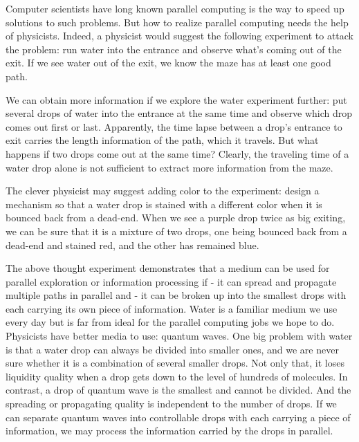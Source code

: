 \documentclass[oneside, letter, 12pt]{book}
\begin{document}
Computer scientists have long known parallel computing is the way to speed up solutions to such problems. But how to realize parallel computing needs the help of physicists. Indeed, a physicist would suggest the following experiment to attack the problem: run water into the entrance and observe what's coming out of the exit. If we see water out of the exit, we know the maze has at least one good path.

We can obtain more information if we explore the water experiment further: put several drops of water into the entrance at the same time and observe which drop comes out first or last. Apparently, the time lapse between a drop's entrance to exit carries the length information of the path, which it travels. But what happens if two drops come out at the same time? Clearly, the traveling time of a water drop alone is not sufficient to extract more information from the maze.

The clever physicist may suggest adding color to the experiment: design a mechanism so that a water drop is stained with a different color when it is bounced back from a dead-end. When we see a purple drop twice as big exiting, we can be sure that it is a mixture of two drops, one being bounced back from a dead-end and stained red, and the other has remained blue.

The above thought experiment demonstrates that a medium can be used for parallel exploration or information processing if
- it can spread and propagate multiple paths in parallel and
- it can be broken up into the smallest drops with each carrying its own piece of information.
Water is a familiar medium we use every day but is far from ideal for the parallel computing jobs we hope to do. Physicists have better media to use: quantum waves. One big problem with water is that a water drop can always be divided into smaller ones, and we are never sure whether it is a combination of several smaller drops. Not only that, it loses liquidity quality when a drop gets down to the level of hundreds of molecules. In contrast, a drop of quantum wave is the smallest and cannot be divided. And the spreading or propagating quality is independent to the number of drops. If we can separate quantum waves into controllable drops with each carrying a piece of information, we may process the information carried by the drops in parallel.
\end{document}
